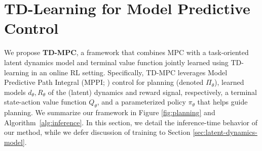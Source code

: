 \documentclass{article}
\begin{document}
\section{TD-Learning for Model Predictive Control}
\label{sec:planning}
\vspace{-0.025in}
We propose \textbf{TD-MPC}, a framework that combines MPC with a task-oriented latent dynamics model and terminal value function jointly learned using TD-learning in an online RL setting. Specifically, TD-MPC leverages Model Predictive Path Integral (MPPI; \citet{Williams2015ModelPP}) control for planning (denoted $\Pi_{\theta}$), learned models $d_{\theta}, R_{\theta}$ of the (latent) dynamics and reward signal, respectively, a terminal state-action value function $Q_{\theta}$, and a parameterized policy $\pi_{\theta}$ that helps guide planning. We summarize our framework in Figure \ref{fig:planning} and Algorithm~\ref{alg:inference}. In this section, we detail the inference-time behavior of our method, while we defer discussion of training to Section \ref{sec:latent-dynamics-model}.
\end{document}
